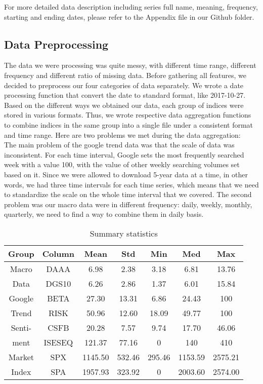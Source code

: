 \documentclass[fleqn,10pt]{SelfArx} %
\begin{document}
\noindent
For more detailed data description including series full name, meaning, frequency, starting and ending dates, please refer to the Appendix file in our Github folder. 

\subsection{Data Preprocessing}

The data we were processing was quite messy, with different time range, different frequency and different ratio of missing data. Before gathering all features, we decided to preprocess our four categories of data separately. We wrote a date processing function that convert the date to standard format, like 2017-10-27. Based on the different ways we obtained our data, each group of indices were stored in various formats. Thus, we wrote respective data aggregation functions to combine indices in the same group into a single file under a consistent format and time range. Here are two problems we met during the data aggregation:\\

\noindent
The main problem of the google trend data was that the scale of data was inconsistent. For each time interval, Google sets the most frequently searched week with a value 100, with the value of other weekly searching volumes set based on it. Since we were allowed to download 5-year data at a time, in other words, we had three time intervals for each time series, which means that we need to standardize the scale on the whole time interval that we covered. The second problem was our macro data were in different frequency: daily, weekly, monthly, quarterly, we need to find a way to combine them in daily basis.\\

\begin{table*}[t]
  \centering
\caption{Summary statistics}
\begin{tabular}{ |c|c|c|c|c|c|c| }
      \hline
      Group & Column & Mean & Std & Min & Med & Max\\
      \hline
      \hline
      Macro & DAAA & 6.98 & 2.38 & 3.18 & 6.81 & 13.76\\
      Data & DGS10 & 6.26 & 2.86 & 1.37 & 6.01 & 15.84\\
      \hline
      Google & BETA & 27.30 & 13.31 & 6.86 & 24.43 & 100\\
      Trend & RISK & 50.96 & 12.60 & 18.09 & 49.77 & 100\\
      \hline
      Senti- & CSFB & 20.28 & 7.57 & 9.74 & 17.70 & 46.06\\
      ment & ISESEQ & 121.37 & 77.16 & 0 & 140 & 410\\
      \hline
      Market & SPX & 1145.50 & 532.46 & 295.46 & 1153.59 & 2575.21\\
      Index & SPA & 1957.93 & 323.92 & 0 & 2003.60 & 2574.00\\
      \hline
  \end{tabular}
  \label{tab:2}
\end{table*}
\end{document}
